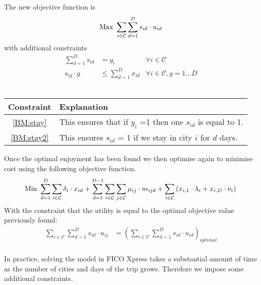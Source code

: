 \documentclass[12pt]{article}
\begin{document}
The new objective function is 
\begin{equation*}
\text{Max } \sum_{i \in \mathcal{C}} \sum_{d=1}^{D} s_{id} \cdot u_{id}\\
\end{equation*}
with additional constraints
\begin{align}
\sum_{d=1}^{D} s_{id} &= y_{i} & \forall i \in \mathcal{C}\label{BM:stay}\\
s_{ig} \cdot g &\leq \sum_{d=1}^{D} x_{id} & \forall i \in \mathcal{C}, g=1...D\label{BM:stay2}
\end{align}\\
\begin{center}
\begin{tabular}{c|p{11cm}}
\hline
\textbf{Constraint} &  \textbf{Explanation} \\
\hline
\ref{BM:stay} & This ensures that if $y_{i}$ =1 then one $s_{id}$ is equal to 1. \\
\hline
\ref{BM:stay2} & This ensures $s_{id}$ = 1 if we stay in city $i$ for $d$ days. \\\hline
\end{tabular}
\end{center}

Once the optimal enjoyment has been found we then optimise again to minimise cost using the following objective function.
\begin{equation*}
\text{Min } \sum_{d=1}^{D} \sum_{i \in \mathcal{C}} \delta_{i} \cdot x_{id} + \sum_{d=1}^{D-1} \sum_{i \in \mathcal{C}} \sum_{j \in \mathcal{C}} \mu_{ij} \cdot m_{ijd} + \sum_{i \in \mathcal{C}} \left( x_{i,1} \cdot \lambda_{i} + x_{i,D} \cdot \nu_{i} \right)\\
\end{equation*}
With the constraint that the utility is equal to the optimal objective value previously found:
\begin{align*}
\sum_{i \in \mathcal{C}} \sum_{d=1}^{D} s_{id} \cdot u_{ij} &= \left(\sum_{i \in \mathcal{C}} \sum_{d=1}^{D} s_{id} \cdot u_{id}\right)_{optimal}
\end{align*}\\

In practice, solving the model in FICO Xpress takes a substantial amount of time as the number of cities and days of the trip grows. Therefore we impose some additional constraints.
\end{document}
